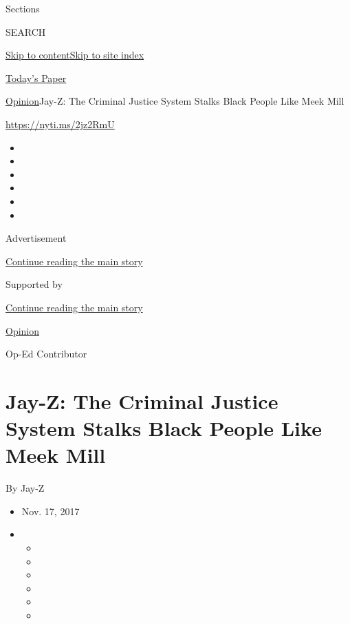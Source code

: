 Sections

SEARCH

\protect\hyperlink{site-content}{Skip to
content}\protect\hyperlink{site-index}{Skip to site index}

\href{https://myaccount.nytimes3xbfgragh.onion/auth/login?response_type=cookie\&client_id=vi}{}

\href{https://www.nytimes3xbfgragh.onion/section/todayspaper}{Today's
Paper}

\href{/section/opinion}{Opinion}\textbar{}Jay-Z: The Criminal Justice
System Stalks Black People Like Meek Mill

\url{https://nyti.ms/2jz2RmU}

\begin{itemize}
\item
\item
\item
\item
\item
\item
\end{itemize}

Advertisement

\protect\hyperlink{after-top}{Continue reading the main story}

Supported by

\protect\hyperlink{after-sponsor}{Continue reading the main story}

\href{/section/opinion}{Opinion}

Op-Ed Contributor

\hypertarget{jay-z-the-criminal-justice-system-stalks-black-people-like-meek-mill}{%
\section{Jay-Z: The Criminal Justice System Stalks Black People Like
Meek
Mill}\label{jay-z-the-criminal-justice-system-stalks-black-people-like-meek-mill}}

By Jay-Z

\begin{itemize}
\item
  Nov. 17, 2017
\item
  \begin{itemize}
  \item
  \item
  \item
  \item
  \item
  \item
  \end{itemize}
\end{itemize}

